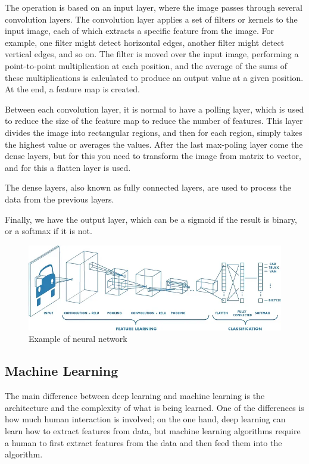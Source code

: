 The operation is based on an input layer, where the image passes through several convolution layers.
The convolution layer applies a set of filters or kernels to the input image, each of which extracts a specific feature from the image. For example, one filter might detect horizontal edges, another filter might detect vertical edges, and so on. The filter is moved over the input image, performing a point-to-point multiplication at each position, and the average of the sums of these multiplications is calculated to produce an output value at a given position. At the end, a feature map is created.

Between each convolution layer, it is normal to have a polling layer, which is used to reduce the size of the feature map to reduce the number of features. This layer divides the image into rectangular regions, and then for each region, simply takes the highest value or averages the values.
After the last max-poling layer come the dense layers, but for this you need to transform the image from matrix to vector, and for this a flatten layer is used.

The dense layers, also known as fully connected layers, are used to process the data from the previous layers.

Finally, we have the output layer, which can be a sigmoid if the result is binary, or a softmax if it is not.

\begin{figure}[H]
\centering
\includegraphics[width=15cm]{images/cnn.png}
\caption{Example of neural network \cite{mediumCNN}}
\end{figure}

\subsection{Machine Learning}
The main difference between deep learning and machine learning is the architecture and the complexity of what is being learned. One of the differences is how much human interaction is involved; on the one hand, deep learning can learn how to extract features from data, but machine learning algorithms require a human to first extract features from the data and then feed them into the algorithm.

